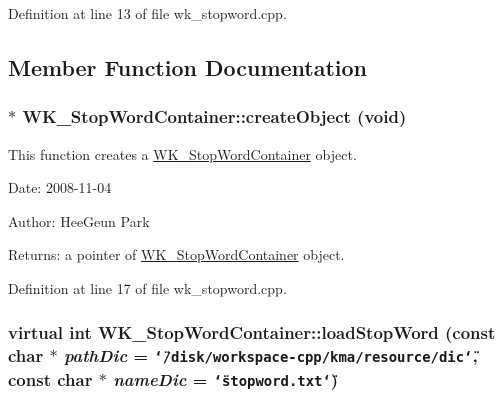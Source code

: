 Definition at line 13 of file wk\_\-stopword.cpp.

\subsection{Member Function Documentation}
\hypertarget{classWK__StopWordContainer_a880c07993f02ddb6d821512d0e5bd0a}{
\subsubsection[{createObject}]{ $\ast$ WK\_\-StopWordContainer::createObject (void)}}
\label{classWK__StopWordContainer_a880c07993f02ddb6d821512d0e5bd0a}


This function creates a \hyperlink{classWK__StopWordContainer}{WK\_\-StopWordContainer} object. 

\begin{Desc}
\item[Date:]2008-11-04 \end{Desc}
\begin{Desc}
\item[Author:]HeeGeun Park \end{Desc}
\begin{Desc}
\item[Returns:]a pointer of \hyperlink{classWK__StopWordContainer}{WK\_\-StopWordContainer} object. \end{Desc}


Definition at line 17 of file wk\_\-stopword.cpp.\hypertarget{classWK__StopWordContainer_2c85df71a7a6a3b86495aed3d21e26d7}{
\subsubsection[{loadStopWord}]{\setlength{\rightskip}{0pt plus 5cm}virtual int WK\_\-StopWordContainer::loadStopWord (const char $\ast$ {\em pathDic} = {\tt \char`\"{}/disk/workspace-cpp/kma/resource/dic\char`\"{}}, \/  const char $\ast$ {\em nameDic} = {\tt \char`\"{}stopword.txt\char`\"{}})}}
\label{classWK__StopWordContainer_2c85df71a7a6a3b86495aed3d21e26d7}


